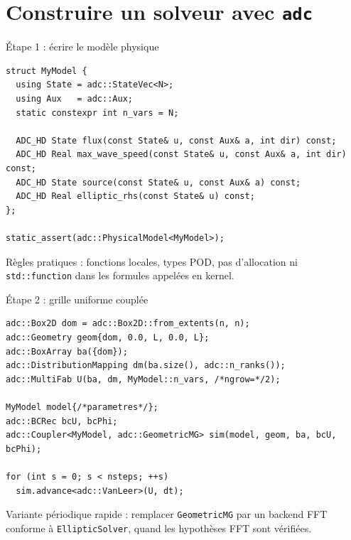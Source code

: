 \documentclass[10pt,aspectratio=169]{beamer}
\newcommand{\code}[1]{\texttt{\footnotesize #1}}
\begin{document}
\section{Construire un solveur avec \texttt{adc}}

\begin{frame}[fragile]{Étape 1 : écrire le modèle physique}
\begin{lstlisting}[style=cppslide]
struct MyModel {
  using State = adc::StateVec<N>;
  using Aux   = adc::Aux;
  static constexpr int n_vars = N;

  ADC_HD State flux(const State& u, const Aux& a, int dir) const;
  ADC_HD Real max_wave_speed(const State& u, const Aux& a, int dir) const;
  ADC_HD State source(const State& u, const Aux& a) const;
  ADC_HD Real elliptic_rhs(const State& u) const;
};

static_assert(adc::PhysicalModel<MyModel>);
\end{lstlisting}

  \vspace{0.25cm}
  Règles pratiques : fonctions locales, types POD, pas d'allocation ni \code{std::function}
  dans les formules appelées en kernel.
\end{frame}

\begin{frame}[fragile]{Étape 2 : grille uniforme couplée}
\begin{lstlisting}[style=cppslide]
adc::Box2D dom = adc::Box2D::from_extents(n, n);
adc::Geometry geom{dom, 0.0, L, 0.0, L};
adc::BoxArray ba({dom});
adc::DistributionMapping dm(ba.size(), adc::n_ranks());
adc::MultiFab U(ba, dm, MyModel::n_vars, /*ngrow=*/2);

MyModel model{/*parametres*/};
adc::BCRec bcU, bcPhi;
adc::Coupler<MyModel, adc::GeometricMG> sim(model, geom, ba, bcU, bcPhi);

for (int s = 0; s < nsteps; ++s)
  sim.advance<adc::VanLeer>(U, dt);
\end{lstlisting}

  \vspace{0.25cm}
  Variante périodique rapide : remplacer \code{GeometricMG} par un backend FFT conforme
  à \code{EllipticSolver}, quand les hypothèses FFT sont vérifiées.
\end{frame}
\end{document}
